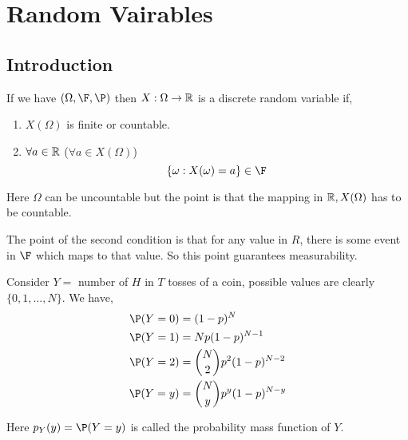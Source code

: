 \chapter{Random Vairables}

\section{Introduction}

\begin{definition}
    If we have $(\Omega, \F, \P)$ then  $X: \Omega \to \mathbb{R}$ is a discrete random variable if,

    \begin{enumerate}
        \item $X(\Omega)$ is finite or countable.
        \item  $\forall a \in \mathbb{R}$ ($\forall a \in X(\Omega)$)
            $$  \{\omega: X(\omega) = a\} \in \F $$ 
    \end{enumerate}
\end{definition}
\begin{remark}
	Here $\Omega$ can be uncountable but the point is that the mapping in $\mathbb{R}, X(\Omega)$ has to be countable.
\end{remark}
\begin{remark}
	The point of the second condition is that for any value in $R$, there is some event in $\F$ which maps to that value. So this point guarantees measurability. 
\end{remark}

\begin{eg}
    Consider $Y = $ number of $H$ in $T$ tosses of a coin, possible values are clearly  $\{0, 1, \dots, N\}$. We have, 
    \begin{align*}
        \P(Y = 0) &= (1 - p)^{N} \\
        \P(Y = 1) &= N p(1 - p)^{N - 1} \\
        \P(Y = 2) &= {N \choose 2} p^2(1 - p)^{N - 2} \\
        \P(Y = y) &= {N \choose y} p^y(1 - p)^{N - y}
    \end{align*}
\end{eg}

\begin{remark}
    Here $p_Y(y) = \P(Y = y)$ is called the probability mass function of  $Y$.
\end{remark}

